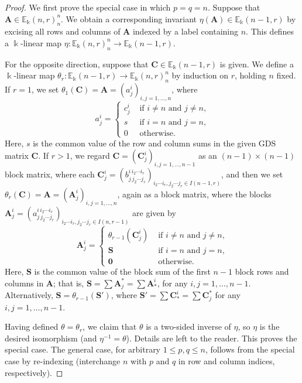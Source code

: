 \documentclass[10pt]{article}
\theoremstyle{definition}
\newcommand{\E}{\mathbb{E}}
\newcommand{\bA}{\mathbf{A}}
\newcommand{\bC}{\mathbf{C}}
\newcommand{\bzero}{\mathbf{0}}
\begin{document}
\begin{proof}
We first prove the special case in which $p=q=n$. Suppose that $\bA
\in \E_\Bbbk(n,r)^n_n$. We obtain a corresponding invariant
$\eta(\bA) \in \E_\Bbbk(n-1,r)$ by excising all rows and columns of
$\bA$ indexed by a label containing $n$. This defines a $\Bbbk$-linear
map $\eta: \E_\Bbbk(n,r)^n_n \to \E_\Bbbk(n-1,r)$.

For the opposite direction, suppose that $\bC \in \E_\Bbbk(n-1,r)$ is
given. We define a $\Bbbk$-linear map $\theta_r: \E_\Bbbk(n-1,r) \to
\E_\Bbbk(n,r)^n_n$ by induction on $r$, holding $n$ fixed. If $r=1$,
we set $\theta_1(\bC) = \bA = (a^i_j)_{i,j = 1, \dots, n}$, where
\[
a^i_j = 
\begin{cases}
 c^i_j & \text{ if $i \ne n$ and $j \ne n$,} \\
 s & \text{ if $i = n$ and $j = n$,} \\
 0 & \text{ otherwise.}
\end{cases}
\]
Here, $s$ is the common value of the row and column sums in the given
GDS matrix $\bC$. If $r>1$, we regard $\bC = (\bC^i_j)_{i,j = 1,
 \dots, n-1}$ as an $(n-1) \times (n-1)$ block matrix, where each
$\bC^i_j = (b^{i\, i_2 \cdots i_r}_{j\, j_2 \cdots j_r})_{i_2 \cdots
 i_r, j_2 \cdots j_r \in I(n-1,r)}$, and then we set $\theta_r(\bC) =
\bA = (\bA^i_j)_{i,j = 1, \dots, n}$, again as a block matrix, where
the blocks $\bA^i_j = (a^{i\, i_2 \cdots i_r}_{j\,j_2 \cdots j_r})_{i_2
 \cdots i_r, j_2 \cdots j_r \in I(n,r-1)}$ are given by
\[
\bA^i_j =
\begin{cases}
 \theta_{r-1}(\bC^i_j) & \text{ if $i \ne n$ and $j \ne n$,} \\
 \mathbf{S} & \text{ if $i=n$ and $j=n$,} \\
 \bzero & \text{ otherwise.}
\end{cases}
\]
Here, $\mathbf{S}$ is the common value of the block sum of the first
$n-1$ block rows and columns in $\bA$; that is, $\mathbf{S} = \sum
\bA^*_j = \sum \bA^i_*$, for any $i, j = 1, \dots,
n-1$. Alternatively, $\mathbf{S} = \theta_{r-1}(\mathbf{S}')$, where
$\mathbf{S}' = \sum \bC^i_* = \sum \bC^*_j$ for any $i,j = 1, \dots,
n-1$.

Having defined $\theta = \theta_r$, we claim that $\theta$ is a two-sided
inverse of $\eta$, so $\eta$ is the desired isomorphism (and
$\eta^{-1} = \theta$). Details are left to the reader. This proves
the special case. The general case, for arbitrary $1 \le p,q \le n$,
follows from the special case by re-indexing (interchange $n$ with $p$
and $q$ in row and column indices, respectively). 
\end{proof}
\end{document}

